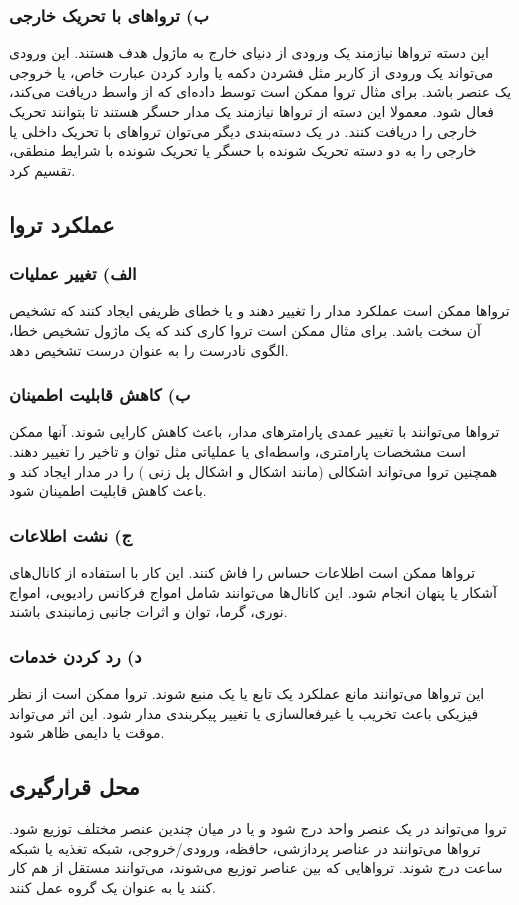 \subsubsection {ب) تروا‌های با تحریک خارجی}
این دسته تروا‌ها نیازمند یک ورودی از دنیای خارج به ماژول هدف هستند. این ورودی می‌تواند یک ورودی از کاربر مثل فشردن دکمه یا وارد کردن عبارت خاص، یا خروجی یک عنصر باشد.  برای مثال تروا ممکن است توسط داده‌ای که از واسط   دریافت می‌کند، فعال شود. معمولا این دسته از تروا‌ها نیازمند یک مدار حسگر هستند تا بتوانند تحریک خارجی را دریافت کنند.
در یک دسته‌بندی دیگر می‌توان تروا‌های با تحریک داخلی یا خارجی را به دو دسته تحریک شونده با حسگر یا تحریک شونده با شرایط منطقی، تقسیم کرد.

\subsection{عملکرد تروا}
\subsubsection {الف) تغییر عملیات}
تروا‌ها ممکن است عملکرد مدار را تغییر دهند و یا خطای ظریفی ایجاد کنند که تشخیص آن سخت باشد. برای مثال ممکن است تروا کاری کند که یک ماژول تشخیص خطا، الگوی نادرست را به عنوان درست تشخیص دهد.
\subsubsection {ب) کاهش قابلیت اطمینان}
تروا‌ها می‌توانند با تغییر عمدی پارامترهای مدار، باعث کاهش کارایی شوند. آنها ممکن است مشخصات پارامتری، واسطه‌ای یا عملیاتی مثل توان و تاخیر را تغییر دهند. همچنین تروا می‌تواند اشکالی (مانند اشکال   و اشکال پل زنی ) را در مدار ایجاد کند و باعث کاهش قابلیت اطمینان شود. 
\subsubsection {ج) نشت اطلاعات} 
تروا‌ها ممکن است اطلاعات حساس را فاش کنند. این کار با استفاده از کانال‌های آشکار یا پنهان انجام شود. این کانال‌ها می‌توانند شامل امواج فرکانس رادیویی، امواج نوری، گرما، توان و اثرات جانبی زمانبندی باشند.
\subsubsection {د) رد کردن  خدمات}
این تروا‌ها می‌توانند مانع عملکرد یک تابع یا یک منبع شوند. تروا ممکن است از نظر فیزیکی باعث تخریب یا غیرفعالسازی یا تغییر پیکربندی مدار شود. این اثر می‌تواند موقت یا دایمی ظاهر شود.

\subsection{محل قرارگیری}
تروا می‌تواند در یک عنصر واحد درج شود و یا در میان چندین عنصر مختلف توزیع شود. تروا‌ها می‌توانند در عناصر پردازشی، حافظه، ورودی/خروجی، شبکه تغذیه یا شبکه ساعت درج شوند. تروا‌هایی که بین عناصر توزیع می‌شوند، می‌توانند مستقل از هم کار کنند یا به عنوان یک گروه عمل کنند. 

